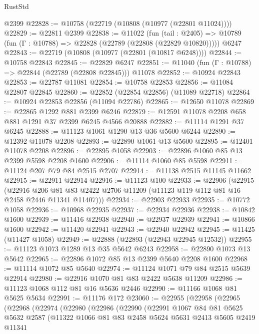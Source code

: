 \begin{lexlean}{RustStd}
\begin{coremodule}
    @2399
@22828 := @10758 (@22719 (@10808 (@10977 (@22801 @11024))))
@22829 := @22811 @2399
@22838 := @11022
    (fun (tail : @2405) => @10789 (fun (Γ : @10788) => @22828 (@22789 (@22808 (@22829 @10820)))))
    @6247
@22843 := @22719 (@10808 (@10977 (@22801 (@10817 @6248))))
@22844 := @10758 @22843
@22845 := @22829 @6247
@22851 := @11040 (fun (Γ : @10788) => @22844 (@22789 (@22808 @22845))) @11078
@22852 := @10924 @22843
@22853 := @22787 @11081
@22854 := @10758 @22853
@22856 := @11084 @22807 @22845
@22860 := @22852 (@22854 @22856) (@11089 @22718)
@22864 := @10924 @22853 @22856 (@11094 @22786)
@22865 := @12650 @11078
@22869 := @22865 @1292 @881 @2399 @6246
@22879 := @12591 @11078 @2208 @658 @881 @1291 @37 @2399 @6245 @4566 @20888
@22882 := @11114 @1291 @37 @6245
@22888 := @11123 @1061 @1290 @13 @36 @5600 @6244
@22890 := @12392 @11078 @2208
@22893 := @22890 @1061 @13 @5600
@22895 := @12401 @11078 @2208
@22896 := @22895 @1058
@22903 := @22896 @1060 @85 @13 @2399 @5598 @2208 @1600
@22906 := @11114 @1060 @85 @5598
@22911 := @11124 @207 @79 @84 @2515 @2707
@22914 := @11138 @2515 @11145 @11662
@22915 := @22911 @22914
@22916 := @11123 @100
@22933 := @22906
    (@22915
      (@22916 @206 @81 @83 @2422 @2706 @11209 (@11123 @119 @112 @81 @16 @2458 @2446 @11341 @11407)))
@22934 := @22903 @22933
@22935 := @10772 @1058
@22936 := @10968 @22935
@22937 := @22934 @22936
@22938 := @10842 @1600
@22939 := @11416 @22938
@22940 := @22937 @22939
@22941 := @10866 @1600
@22942 := @11420 @22941
@22943 := @22940 @22942
@22945 := @11425 (@11427 @1058)
@22949 := @22888 (@22893 (@22943 @22945 @12532))
@22955 := @11123 @1073 @1289 @13 @35 @5642 @6243
@22958 := @22890 @1073 @13 @5642
@22965 := @22896 @1072 @85 @13 @2399 @5640 @2208 @1600
@22968 := @11114 @1072 @85 @5640
@22974 := @11124 @1071 @79 @84 @2515 @5639 @22914
@22980 := @22916 @1070 @81 @83 @2422 @5638 @11209
@22986 := @11123 @1068 @112 @81 @16 @5636 @2446
@22990 := @11166 @1068 @81 @5625 @5634
@22991 := @11176 @172
@23060 := @22955
    (@22958
      (@22965
        (@22968
          (@22974
            (@22980
              (@22986
                (@22990
                  (@22991
                    @1067
                    @84
                    @81
                    @5625
                    @5632
                    @2587
                    (@11322
                      @1066
                      @81
                      @83
                      @2458
                      @5624
                      @5631
                      @2413
                      @5605
                      @2419
                      @11341

\end{coremodule}
\end{lexlean}
